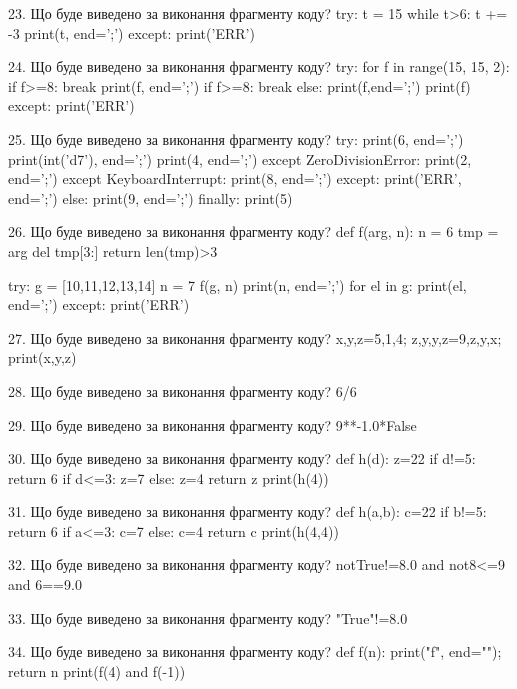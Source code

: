 \documentclass[11pt]{article}
\begin{document}

23. Що буде виведено за виконання фрагменту коду?
try:
    t = 15
    while t>6:
        t += -3
    print(t, end=';')
except:
    print('ERR')


24. Що буде виведено за виконання фрагменту коду?
try:
    for f in range(15, 15, 2):
        if f>=8:
            break
        print(f, end=';')
        if f>=8:
            break
    else:
        print(f,end=';')
    print(f)
except:
    print('ERR')


25. Що буде виведено за виконання фрагменту коду?
try:
    print(6, end=';')
    print(int('d7'), end=';')
    print(4, end=';')
except ZeroDivisionError:
    print(2, end=';')
except KeyboardInterrupt:
    print(8, end=';')
except:
    print('ERR', end=';')
else:
    print(9, end=';')
finally:
    print(5)


26. Що буде виведено за виконання фрагменту коду?
def f(arg, n):
    n = 6
    tmp = arg
    del tmp[3:]
    return len(tmp)>3

try:
    g = [10,11,12,13,14]
    n = 7
    f(g, n)
    print(n, end=';')
    for el in g:
        print(el, end=';')
except:
    print('ERR')


27. Що буде виведено за виконання фрагменту коду?
x,y,z=5,1,4;  z,y,y,z=9,z,y,x;  print(x,y,z)

28. Що буде виведено за виконання фрагменту коду?
6/6%

29. Що буде виведено за виконання фрагменту коду?
9**-1.0*False

30. Що буде виведено за виконання фрагменту коду?
def h(d):
      z=22
      if d!=5: return 6
      if d<=3: z=7
      else: z=4
      return z
   print(h(4))

31. Що буде виведено за виконання фрагменту коду?
def h(a,b):
      c=22
      if b!=5: return 6
      if a<=3: c=7
      else: c=4
      return c
   print(h(4,4))

32. Що буде виведено за виконання фрагменту коду?
notTrue!=8.0 and not8<=9 and 6==9.0

33. Що буде виведено за виконання фрагменту коду?
"True"!=8.0

34. Що буде виведено за виконання фрагменту коду?
def f(n): print("f", end=""); return n
   print(f(4) and f(-1))
\end{document}
